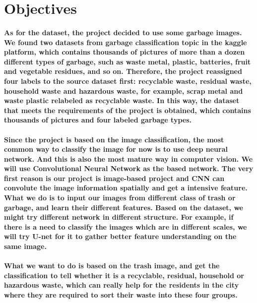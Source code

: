 \documentclass{article}
\begin{document}
\section*{Objectives}

\paragraph{As for the dataset, the project decided to use some garbage images. We found two datasets from garbage classification topic in the kaggle platform, which contains thousands of pictures of more than a dozen different types of garbage, such as waste metal, plastic, batteries, fruit and vegetable residues, and so on. Therefore, the project reassigned four labels to the source dataset first: recyclable waste, residual waste, household waste and hazardous waste, for example, scrap metal and waste plastic relabeled as recyclable waste. In this way, the dataset that meets the requirements of the project is obtained, which contains thousands of pictures and four labeled garbage types.}

\paragraph{Since the project is based on the image classification, the most common way to classify the image for now is to use deep neural network. And this is also the most mature way in computer vision. We will use Convolutional Neural Network as the based network. The very first reason is our project is image-based project and CNN can convolute the image information spatially and get a intensive feature. What we do is to input our images from different class of trash or garbage, and learn their different features. Based on the dataset, we might try different network in different structure. For example, if there is a need to classify the images which are in different scales, we will try U-net for it to gather better feature understanding on the same image.}

\paragraph{What we want to do is based on the trash image, and get the classification to tell whether it is a recyclable, residual, household or hazardous waste, which can really help for the residents in the city where they are required to sort their waste into these four groups.}



\end{document}
